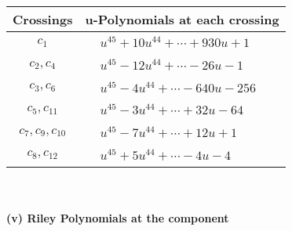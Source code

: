\documentclass[1p]{elsarticle_modified}
\theoremstyle{definition}
\begin{document}
\begin{tabular}{m{50pt}|m{274pt}}
Crossings & \hspace{64pt}u-Polynomials at each crossing \\
\hline $$\begin{aligned}c_{1}\end{aligned}$$&$\begin{aligned}
&u^{45}+10 u^{44}+\cdots+930 u+1
\end{aligned}$\\
\hline $$\begin{aligned}c_{2},c_{4}\end{aligned}$$&$\begin{aligned}
&u^{45}-12 u^{44}+\cdots-26 u-1
\end{aligned}$\\
\hline $$\begin{aligned}c_{3},c_{6}\end{aligned}$$&$\begin{aligned}
&u^{45}-4 u^{44}+\cdots-640 u-256
\end{aligned}$\\
\hline $$\begin{aligned}c_{5},c_{11}\end{aligned}$$&$\begin{aligned}
&u^{45}-3 u^{44}+\cdots+32 u-64
\end{aligned}$\\
\hline $$\begin{aligned}c_{7},c_{9},c_{10}\end{aligned}$$&$\begin{aligned}
&u^{45}-7 u^{44}+\cdots+12 u+1
\end{aligned}$\\
\hline $$\begin{aligned}c_{8},c_{12}\end{aligned}$$&$\begin{aligned}
&u^{45}+5 u^{44}+\cdots-4 u-4
\end{aligned}$\\
\hline
\end{tabular}\\~\\
\newpage\renewcommand{\arraystretch}{1}
\flushleft \textbf{(v) Riley Polynomials at the component}\newline \\
\end{document}
